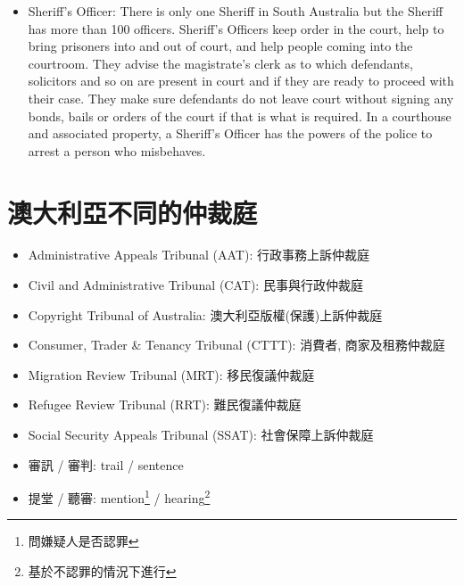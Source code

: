 \begin{itemize}
  \item Sheriff's Officer: There is only one Sheriff in South Australia but the Sheriff has more than 100 officers. Sheriff’s Officers keep order in the court, help to bring prisoners into and out of court, and help people coming into the courtroom. They advise the magistrate's clerk as to which defendants, solicitors and so on are present in court and if they are ready to proceed with their case. They make sure defendants do not leave court without signing any bonds, bails or orders of the court if that is what is required. In a courthouse and associated property, a Sheriff’s Officer has the powers of the police to arrest a person who misbehaves.
\end{itemize}

\section{澳大利亞不同的仲裁庭}
\begin{itemize}
  \itemsep0em
  \item Administrative Appeals Tribunal (AAT): 行政事務上訴仲裁庭
  \item Civil and Administrative Tribunal (CAT): 民事與行政仲裁庭
  \item Copyright Tribunal of Australia: 澳大利亞版權(保護)上訴仲裁庭
  \item Consumer, Trader \& Tenancy Tribunal (CTTT): 消費者, 商家及租務仲裁庭
  \item Migration Review Tribunal (MRT): 移民復議仲裁庭
  \item Refugee Review Tribunal (RRT): 難民復議仲裁庭
  \item Social Security Appeals Tribunal (SSAT): 社會保障上訴仲裁庭
\end{itemize}

\begin{itemize}
  \itemsep0em
  \item 審訊 / 審判: trail / sentence
  \item 提堂 / 聽審: mention\footnote{問嫌疑人是否認罪} / hearing\footnote{基於不認罪的情況下進行}
\end{itemize}

